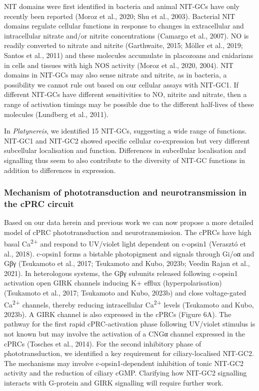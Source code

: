 \documentclass[
  11pt,
  letterpaper,
  DIV=11,
  numbers=noendperiod]{scrartcl}
\begin{document}
NIT domains were first identified in bacteria and animal NIT-GCs have
only recently been reported (Moroz et al., 2020; Shu et al., 2003).
Bacterial NIT domains regulate cellular functions in response to changes
in extracellular and intracellular nitrate and/or nitrite concentrations
(Camargo et al., 2007). NO is readily converted to nitrate and nitrite
(Garthwaite, 2015; Möller et al., 2019; Santos et al., 2011) and these
molecules accumulate in placozoans and cnidarians in cells and tissues
with high NOS activity (Moroz et al., 2020, 2004). NIT domains in
NIT-GCs may also sense nitrate and nitrite, as in bacteria, a
possibility we cannot rule out based on our cellular assays with
NIT-GC1. If different NIT-GCs have different sensitivities to NO,
nitrite and nitrate, then a range of activation timings may be possible
due to the different half-lives of these molecules (Lundberg et al.,
2011).

In \emph{Platynereis}, we identified 15 NIT-GCs, suggesting a wide range
of functions. NIT-GC1 and NIT-GC2 showed specific cellular co-expression
but very different subcellular localisation and function. Differences in
subcellular localisation and signalling thus seem to also contribute to
the diversity of NIT-GC functions in addition to differences in
expression.

\subsubsection{Mechanism of phototransduction and neurotransmission in
the cPRC
circuit}\label{mechanism-of-phototransduction-and-neurotransmission-in-the-cprc-circuit}

Based on our data herein and previous work we can now propose a more
detailed model of cPRC phototransduction and neurotransmission. The
cPRCs have high basal Ca\textsuperscript{2+} and respond to UV/violet
light dependent on c-opsin1 (Verasztó et al., 2018). c-opsin1 forms a
bistable photopigment and signals through Gi/oα and Gβγ (Tsukamoto et
al., 2017; Tsukamoto and Kubo, 2023b; Veedin Rajan et al., 2021). In
heterologous systems, the Gβγ subunits released following c-opsin1
activation open GIRK channels inducing K+ efflux (hyperpolarisation)
(Tsukamoto et al., 2017; Tsukamoto and Kubo, 2023b) and close
voltage-gated Ca\textsuperscript{2+} channels, thereby reducing
intracellular Ca\textsuperscript{2+} levels (Tsukamoto and Kubo, 2023b).
A GIRK channel is also expressed in the cPRCs (Figure 6A). The pathway
for the first rapid cPRC-activation phase following UV/violet stimulus
is not known but may involve the activation of a CNGα channel expressed
in the cPRCs (Tosches et al., 2014). For the second inhibitory phase of
phototransduction, we identified a key requirement for ciliary-localised
NIT-GC2. The mechanisms may involve c-opsin1-dependent inhibition of
tonic NIT-GC2 activity and the reduction of ciliary cGMP. Clarifying how
NIT-GC2 signalling interacts with G-protein and GIRK signalling will
require further work.
\end{document}
